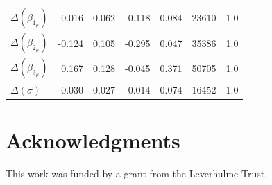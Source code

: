 \documentclass[doc,biblatex]{apa7}
\begin{document}
\begin{table}
\begin{center}
\begin{threeparttable}
\begin{tabular}{lrrrrrr}
$\Delta(\beta_{1_\mu})$     & -0.016 &  0.062 &  -0.118 &    0.084 &   23610 &    1.0 \\
$\Delta(\beta_{2_\mu})$     & -0.124 &  0.105 &  -0.295 &    0.047 &   35386 &    1.0 \\
$\Delta(\beta_{3_\mu})$     &  0.167 &  0.128 &  -0.045 &    0.371 &   50705 &    1.0 \\
$\Delta(σ)$      &  0.030 &  0.027 &  -0.014 &    0.074 &   16452 &    1.0 \\
\bottomrule
\end{tabular}
\label{exp2_parameter_estimates}
\end{threeparttable}
\end{center}
\end{table}


\section{Acknowledgments}

\noindent This work was funded by a grant from the Leverhulme Trust.

\printbibliography
\end{document}
